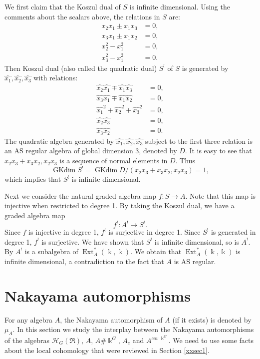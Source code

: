 \begin{example}
We first claim that the Koszul dual of $S$
is infinite dimensional. Using the comments about the 
scalars above, the relations in $S$ are:
$$\begin{aligned}
x_2 x_1 \pm x_1 x_3&=0,\\
x_3x_1 \pm   x_1 x_2&=0,\\
x_2^2 -x_1^2 &=0,\\
x_3^2 - x_1^2&=0.
\end{aligned}
$$
Then Koszul dual (also called the quadratic dual) $S^!$ of $S$ is 
generated by $\widehat{x_1}, \widehat{x_2}, \widehat{x_3}$ 
with relations: 
$$ \begin{aligned}
\widehat{x_2}  \widehat{x_1} \mp   \widehat{x_1}  \widehat{x_3}&= 0,\\ 
\widehat{x_3} \widehat{x_1} \mp \widehat{x_1} \widehat{ x_2} &= 0,\\
\widehat{x_1}^2 +  \widehat{x_2}^2+ \widehat{x_3}^2 &=0,\\
\widehat{x_2} \widehat{x_3} &= 0,\\
\widehat{x_3} \widehat{x_2} &= 0.
\end{aligned}
$$
The quadratic algebra generated by 
$\widehat{x_1}, \widehat{x_2}, \widehat{x_3}$ subject to 
the first three relation is an AS regular algebra of global
dimension 3, denoted by $D$. It is easy to see that 
$x_2x_3+x_3x_2, x_2x_3$ is a sequence of normal elements
in $D$. Thus 
$$\operatorname{GKdim} S^!=\operatorname{GKdim} D/(x_2x_3+x_3x_2, x_2x_3)=1,$$ 
which implies that $S^!$ is infinite dimensional.

Next we consider the natural graded algebra map $f: S\to A$. 
Note that this map is injective when restricted to degree 1. 
By taking the Koszul dual, we have a graded algebra map
$$f^!: A^!\to S^!.$$
Since $f$ is injective in degree 1, $f^!$ is surjective
in degree 1. Since $S^!$ is generated in degree 1, $f^!$
is surjective. We have shown that $S^!$ is infinite
dimensional, so is $A^!$. By \cite[Proposition 1.3.1, p. 7]{PP}
$A^!$ is a subalgebra of $\operatorname{Ext}^*_A(\Bbbk,\Bbbk)$. We obtain 
that $\operatorname{Ext}^*_A(\Bbbk,\Bbbk)$
is infinite dimensional, a contradiction to the fact that $A$ is 
AS regular.
\end{example}

\section{Nakayama automorphisms}
\label{xxsec4}

For any algebra $A$, the Nakayama automorphism of $A$ (if it exists) is denoted
by $\mu_A$. 
In this section we study the interplay between the Nakayama automorphisms
of the algebras ${\mathcal H}_G(\Re)$, $A$, $A\# \Bbbk^G$, $A_e$ and $A^{cov\; \Bbbk^G}$.
We need to use some facts about the local cohomology that were 
reviewed in Section \ref{xxsec1}.

